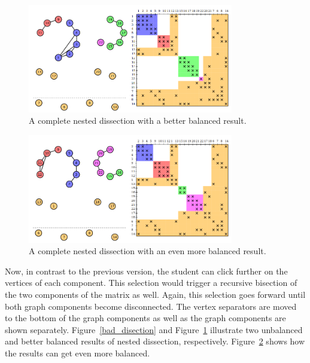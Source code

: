 \documentclass[12pt, twoside,a4paper,toc=bibliography]{scrbook}
\begin{document}
\begin{figure}
\centering
\includegraphics[width=0.8\textwidth]{good_disection}
\caption{A complete nested dissection with a better balanced result.}
\label{good_disection}
\end{figure}

\begin{figure}
\centering
\includegraphics[width=0.8\textwidth]{good_disection2}
\caption{A complete nested dissection with an even more balanced result.}
\label{good_disection2}
\end{figure}

Now, in contrast to the previous version, the student can click further
on the vertices of each component. This selection would trigger a recursive
bisection of the two components of the matrix as well. Again, this selection goes forward until
both graph components become disconnected. The vertex separators
are moved to the bottom of the graph components as well as the graph components
are shown separately.
Figure~\ref{bad_disection} and Figure~\ref{good_disection}
illustrate two unbalanced and better balanced results of nested dissection,
respectively. Figure~\ref{good_disection2} shows how the results can
get even more balanced.
\end{document}
